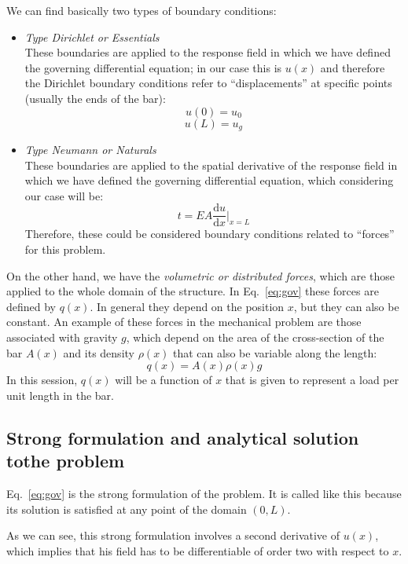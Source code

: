 \documentclass[spanish,a4paper,12pt]{article}
\begin{document}
We can find basically two types of boundary conditions:

\begin{itemize}
\item \textit{Type Dirichlet or Essentials}\\
These boundaries are applied to the response field in which we have defined the governing differential equation; in our case this is \(u(x)\) and therefore the Dirichlet boundary conditions refer to ``displacements'' at specific points (usually the ends of the bar):
$$
u(0)=u_0
$$$$
u(L)=u_g
$$
\item \textit{Type Neumann or Naturals}\\
These boundaries are applied to the spatial derivative of the response field in which we have defined the governing differential equation, which considering our case will be:
$$
t= EA \frac{\mathrm{d} u}{\mathrm{d} x} \biggr\rvert_{x=L}
$$
Therefore, these could be considered boundary conditions related to ``forces'' for this problem.

\end{itemize}
On the other hand, we have the \textit{volumetric or distributed forces}, which are those applied to the whole domain of the structure. In Eq.~\eqref{eq:gov} these forces are defined by $q(x)$. In general they depend on the position $x$, but they can also be constant.
An example of these forces in the mechanical problem are those associated with gravity $g$, which depend on the area of the cross-section of the bar $A(x)$ and its density $\rho(x)$ that can also be variable along the length:
\begin{equation*}
q(x) =A(x) \rho(x) g
\end{equation*}
In this session, $q(x)$ will be a function of $x$ that is given to represent a load per unit length in the bar.

\subsection{Strong formulation and analytical solution tothe problem}
\label{sec:analitica}
Eq.~\eqref{eq:gov} is the strong formulation of the problem. It is called like this because its solution is satisfied at any point of the domain $(0,L)$. 

As we can see, this strong formulation involves a second derivative of \(u(x)\), which implies that his field has to be differentiable of order two with respect to $x$.\\
\end{document}
